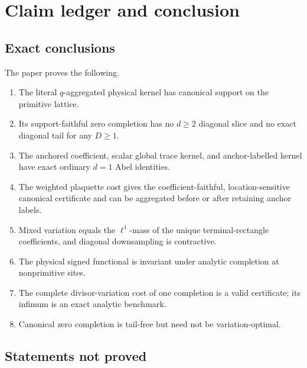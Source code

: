 \section{Claim ledger and conclusion}
\label{sec:claim-boundary}

\subsection{Exact conclusions}

The paper proves the following.
\begin{enumerate}[label=\textup{(\arabic*)},leftmargin=3em]
 \item The literal \(q\)-aggregated physical kernel has canonical support
       on the primitive lattice.
 \item Its support-faithful zero completion has no \(d\ge2\) diagonal
       slice and no exact diagonal tail for any \(D\ge1\).
 \item The anchored coefficient, scalar global trace kernel, and
       anchor-labelled kernel have exact ordinary \(d=1\) Abel identities.
 \item The weighted plaquette cost gives the coefficient-faithful,
       location-sensitive canonical certificate and can be aggregated
       before or after retaining anchor labels.
 \item Mixed variation equals the \(\ell^1\)-mass of the unique
       terminal-rectangle coefficients, and diagonal downsampling is
       contractive.
 \item The physical signed functional is invariant under analytic
       completion at nonprimitive sites.
 \item The complete divisor-variation cost of one completion is a valid
       certificate; its infimum is an exact analytic benchmark.
 \item Canonical zero completion is tail-free but need not be
       variation-optimal.
\end{enumerate}

\subsection{Statements not proved}

